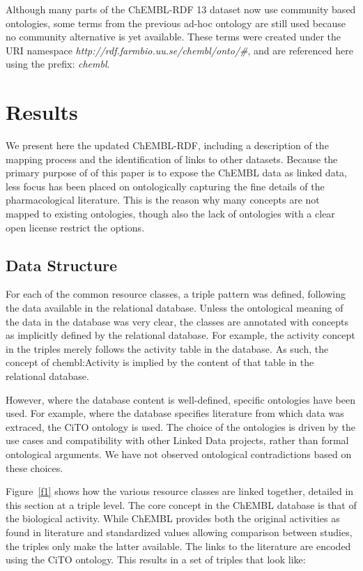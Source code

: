 \documentclass[10pt]{bmc_article}
\newenvironment{bmcformat}{\begin{raggedright}\baselineskip20pt\sloppy\setboolean{publ}{false}}{\end{raggedright}\baselineskip20pt\sloppy}
\begin{document}
\begin{bmcformat}
Although many parts of the ChEMBL-RDF 13 dataset now use community based ontologies, some 
terms from the previous ad-hoc ontology are still used because no community alternative is yet available. 
These terms were created under the 
URI namespace \textit{http://rdf.farmbio.uu.se/chembl/onto/\#}, and are referenced here using the
prefix: \textit{chembl}.


\section*{Results}
\label{s3}

We present here the updated ChEMBL-RDF, including a description of the mapping process 
and the identification of links to other datasets. Because the primary purpose of of this
paper is to expose the ChEMBL data as linked data, less focus has been placed on ontologically
capturing the fine details of the pharmacological literature. This is the reason why
many concepts are not mapped to existing ontologies, though also the lack of ontologies
with a clear open license restrict the options.

\subsection*{Data Structure}

For each of the common resource classes, a triple pattern was defined, following the
data available in the relational database. Unless the ontological meaning of the data
in the database was very clear, the classes are annotated with concepts as implicitly
defined by the relational database. For example, the activity concept in the triples
merely follows the activity table in the database. As such, the concept of chembl:Activity
is implied by the content of that table in the relational database.

However, where the database content is well-defined, specific ontologies have been used.
For example, where the database specifies literature from which data was extraced,
the CiTO ontology is used. The choice of the ontologies is driven by the use cases and
compatibility with other Linked Data projects, rather than formal ontological arguments.
We have not observed ontological contradictions based on these choices.

Figure~\ref{f1} shows how the various resource classes are linked together, detailed in
this section at a triple level.
The core concept in the ChEMBL database is that of the biological activity.
While ChEMBL provides both the original activities as found in literature
and standardized values allowing comparison between studies, the triples only
make the latter available. The links to the literature are encoded using the CiTO ontology.
This results in a set of triples that look like:


\end{bmcformat}
\end{document}
